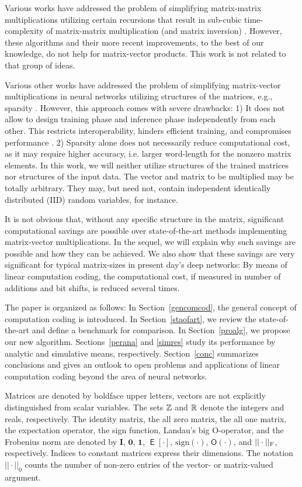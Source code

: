 \documentclass[twocolumn]{IEEEtran}
\def\expect{\mathop{\mbox{$\mathsf{E}$}}}
\begin{document}
Various works have addressed the problem of simplifying matrix-matrix multiplications utilizing certain recursions that result in sub-cubic time-complexity of matrix-matrix multiplication (and matrix inversion) \cite{strassen:69,copperfield:90}. However, these algorithms and their more recent improvements, to the best of our knowledge, do not help for matrix-vector products. This work is not related to that group of ideas.

Various other works have addressed the problem of simplifying matrix-vector multiplications in neural networks utilizing structures of the matrices, e.g., sparsity \cite{han:15,louizos:17}. However, this approach comes with severe drawbacks: 1) It does not allow to design training phase and inference phase independently from each other. This restricts interoperability, hinders efficient training, and compromises performance \cite{evci:19}. 2) Sparsity alone does not necessarily reduce computational cost, as it may require higher accuracy, i.e. larger word-length for the nonzero matrix elements. In this work, we will neither utilize structures of the trained matrices nor structures of the input data. The vector and matrix to be multiplied may be totally arbitrary. They may, but need not, contain independent identically distributed (IID) random variables, for instance.

It is not obvious that, without any specific structure in the matrix, significant computational savings are possible over state-of-the-art methods implementing matrix-vector multiplications. In the sequel, we will explain why such savings are possible and how they can be achieved. We also show that these savings are very significant for typical matrix-sizes in present day's deep networks: By means of linear computation coding, the computational cost, if measured in number of additions and bit shifts, is reduced several times.

The paper is organized as follows:
In Section~\ref{gencomcod}, the general concept of computation coding is introduced.
In Section~\ref{staofart}, we review the state-of-the-art and define a benchmark for comparison.
In Section~\ref{proalg}, we propose our new algorithm.
Sections~\ref{perana} and \ref{simres} study its performance by analytic and simulative means, respectively.
Section~\ref{conc} summarizes conclusions and gives an outlook to open problems and applications of linear computation coding beyond the area of neural networks. 

Matrices are denoted by boldface upper letters, vectors are not explicitly distinguished from scalar variables. The sets $\mathbb{Z}$ and $\mathbb{R}$ denote the integers and reals, respectively. The identity matrix, the all zero matrix, the all one matrix, the expectation operator, the sign function, Landau's big O-operator, and the Frobenius norm are denoted by $\mathbf I$, $\mathbf 0$, $\mathbf 1$, $\expect [\cdot]$, $\text{sign}(\cdot)$, ${\mathsf O}(\cdot)$, and $||\cdot||_{\text F}$, respectively. Indices to constant matrices express their dimensions. The notation $||\cdot||_0$ counts the number of non-zero entries of the vector- or matrix-valued argument.
\end{document}
